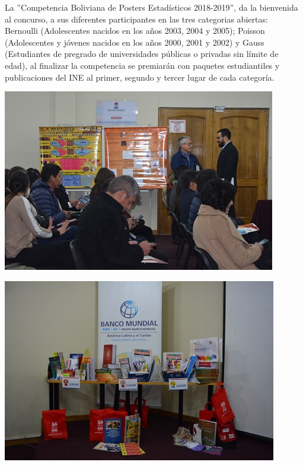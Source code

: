 \documentclass[8pt,a4paper]{article} %
\begin{document}
\begin{multicols}{2}
La ''Competencia Boliviana de Posters Estadísticos 2018-2019'', da la bienvenida al concurso, a sus diferentes participantes en las tres categorias abiertas: Bernoulli (Adolescentes nacidos en los años 2003, 2004 y 2005); Poisson (Adolescentes y jóvenes nacidos en los años 2000, 2001 y 2002) y Gauss (Estudiantes de pregrado de universidades públicas o privadas sin límite de edad), al finalizar la competencia se premiarán con paquetes estudiantiles y publicaciones del INE  al  primer, segundo y tercer lugar de cada categoría.

\vspace{0.5cm}

\begin{center}
\includegraphics[scale=0.15]{foto6.jpg} %
\end{center}

\vspace{10cm}

\begin{center}
\includegraphics[scale=0.15]{foto5.jpg} %
\end{center}

\vspace{10cm}

\end{multicols} %
\end{document}
